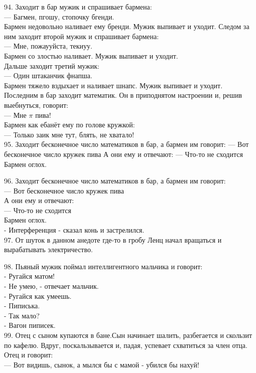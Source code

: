\documentclass[a4paper,20pt,notitlepage]{extbook}
\begin{document}
	94. Заходит в бар мужик и спрашивает бармена:\\
	— Багмен, пгошу, стопочку бгенди.\\
	Бармен недовольно наливает ему бренди. Мужик выпивает и уходит. Следом за ним заходит второй мужик и спрашивает бармена:\\
	— Мне, пожаууйста, текиуу.\\
	Бармен со злостью наливает. Мужик выпивает и уходит.\\
	Дальше заходит третий мужик:\\
	— Один штаканчик фнапша.\\
	Бармен тяжело вздыхает и наливает шнапс. Мужик выпивает и уходит.\\
	Последним в бар заходит математик. Он в приподнятом настроении и, решив выебнуться, говорит:\\
	— Мне $\pi$ пива!\\
	Бармен как ебанёт ему по голове кружкой:\\
	— Только заик мне тут, блять, не хватало!\\
	
	95. Заходит бесконечное число математиков в бар, а бармен им говорит:
	— Вот бесконечное число кружек пива
	А они ему и отвечают:
	— Что-то не сходится
	Бармен оглох.
	
	96. Заходит бесконечное число математиков в бар, а бармен им говорит:\\
	— Вот бесконечное число кружек пива\\
	А они ему и отвечают:\\
	— Что-то не сходится\\
	Бармен оглох.\\
	- Интерференция - сказал конь и застрелился.\\
	
	97. От шуток в данном анедоте где-то в гробу Ленц начал вращаться и вырабатывать электричество.
	
	98. Пьяный мужик поймал интеллигентного мальчика и говорит: \\
	- Ругайся матом! \\
	- Не умею, - отвечает мальчик. \\
	- Ругайся как умеешь. \\
	- Пиписька. \\
	- Так мало? \\
	- Вагон пиписек.\\
	
	99. Отец с сыном купаются в бане.Сын начинает шалить, разбегается и скользит по кафелю.
	 Вдруг, поскальзывается и, падая, успевает схватиться за член отца.\\
	Отец и говорит:\\
	— Вот видишь, сынок, а мылся бы с мамой - убился бы нахуй!\\
	
\end{document}
